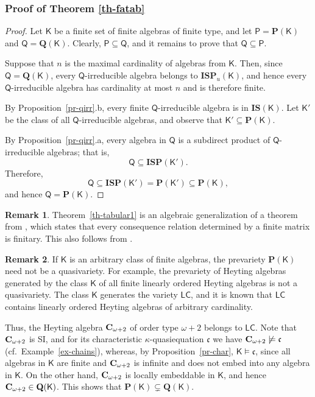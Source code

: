 \documentclass[submission,copyright,creativecommons]{eptcs}
\theoremstyle{definition}
\newtheorem{remark}{Remark}
\newcommand{\alg}[1]{{{\textbf{\upshape #1}}}}
\newcommand{\QQ}{\mathbf{Q}}
\newcommand{\PR}{\mathbf{P}}
\newcommand{\SU}{\pmb{S}}
\newcommand{\II}{\pmb{I}}
\newcommand{\PP}{\pmb{P}}
\newcommand{\vv}[1]{\mathsf {#1}}
\newcommand{\vK}{\vv K}
\newcommand{\kk}{\kappa}
\newcommand{\csq}{\mathfrak{c}}
\begin{document}
\subsubsection*{Proof of Theorem \ref{th-fatab}}
\begin{proof}
	Let $\vK$ be a finite set of finite algebras of finite type, and let $\vv P = \PR(\vv K)$ and $\vv Q = \QQ(\vv K)$. Clearly, $\vv P \subseteq \vv Q$, and it remains to prove that $\vv Q \subseteq \vv P$.
	
	Suppose that $n$ is the maximal cardinality of algebras from $\vv K$. Then, since $\vv Q = \QQ(\vv K)$, every $\vv Q$-irreducible algebra belongs to $\II\SU\PP_u(\vv K)$, and hence every $\vv Q$-irreducible algebra has cardinality at most $n$ and is therefore finite.
	
	By Proposition~\ref{pr-qirr}.b, every finite $\vv Q$-irreducible algebra is in $\II\SU(\vv K)$. Let $\vv K'$ be the class of all $\vv Q$-irreducible algebras, and observe that $\vv K' \subseteq \PR(\vv K)$.
	
	By Proposition~\ref{pr-qirr}.a, every algebra in $\vv Q$ is a subdirect product of $\vv Q$-irreducible algebras; that is,
	\[
	\vv Q \subseteq \II\SU\PP(\vv K').
	\]
	Therefore,
	\[
	\vv Q \subseteq \II\SU\PP(\vv K') = \PR(\vv K') \subseteq \PR(\vv K),
	\]
	and hence $\vv Q = \PR(\vv K)$.
\end{proof}

\begin{remark}
	Theorem~\ref{th-tabular1} is an algebraic generalization of a theorem from \cite{LosSuszkoRemarks1958}, which states that every consequence relation determined by a finite matrix is finitary. This also follows from \cite[Theorem~2.3.1]{GorbunovBookE}.
\end{remark}

\begin{remark}
	If $\vv K$ is an arbitrary class of finite algebras, the prevariety $\PR(\vv K)$ need not be a quasivariety. For example, the prevariety of Heyting algebras generated by the class $\vK$ of all finite linearly ordered Heyting algebras is not a quasivariety. The class $\vK$ generates the variety $\vv{LC}$, and it is known that $\vv{LC}$ contains linearly ordered Heyting algebras of arbitrary cardinality.
	
	Thus, the Heyting algebra $\alg{C}_{\omega +2}$ of order type $\omega +2$ belongs to $\vv{LC}$. Note that $\alg{C}_{\omega +2}$ is SI, and for its characteristic $\kk$-quasiequation $\csq$ we have $\alg{C}_{\omega+2} \not\models \csq$ (cf.\ Example~\ref{ex-chains}), whereas, by Proposition~\ref{pr-char}, $\vv K \models \csq$, since all algebras in $\vv K$ are finite and $\alg{C}_{\omega+2}$ is infinite and does not embed into any algebra in $\vv K$. On the other hand, $\alg{C}_{\omega +2}$ is locally embeddable in $\vK$, and hence $\alg{C}_{\omega+2} \in \QQ(\vK)$. This shows that $\PR(\vv K) \subsetneq \QQ(\vv K)$.
\end{remark}
\end{document}
